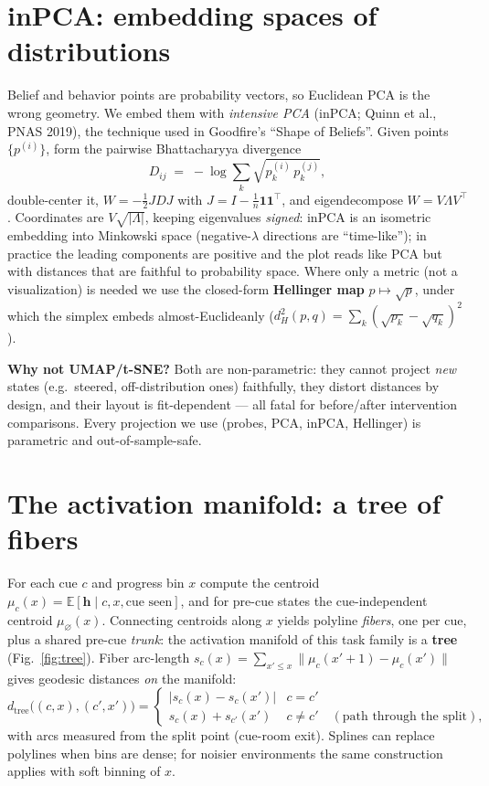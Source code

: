 \documentclass[11pt]{article}
\newcommand{\h}{\bm{h}}
\newcommand{\E}{\mathbb{E}}
\begin{document}
\section{inPCA: embedding spaces of distributions}
\label{sec:inpca}

Belief and behavior points are probability vectors, so Euclidean PCA is the
wrong geometry. We embed them with \emph{intensive PCA}
(inPCA; Quinn et al., PNAS 2019), the technique used in Goodfire's
``Shape of Beliefs''. Given points $\{p^{(i)}\}$, form the pairwise
Bhattacharyya divergence
\begin{equation}
  D_{ij} \;=\; -\log \textstyle\sum_k \sqrt{p^{(i)}_k\, p^{(j)}_k},
\end{equation}
double-center it, $W = -\tfrac12 J D J$ with $J = I - \tfrac1n \bm 1\bm 1^\top$,
and eigendecompose $W = V \Lambda V^\top$. Coordinates are
$V\sqrt{|\Lambda|}$, keeping eigenvalues \emph{signed}: inPCA is an isometric
embedding into Minkowski space (negative-$\lambda$ directions are
``time-like''); in practice the leading components are positive and the plot
reads like PCA but with distances that are faithful to probability space.
Where only a metric (not a visualization) is needed we use the closed-form
\textbf{Hellinger map} $p \mapsto \sqrt{p}$, under which the simplex embeds
almost-Euclideanly ($d_H^2(p,q) = \sum_k (\sqrt{p_k}-\sqrt{q_k})^2$).

\begin{tcolorbox}
\textbf{Why not UMAP/t-SNE?} Both are non-parametric: they cannot project
\emph{new} states (e.g.\ steered, off-distribution ones) faithfully, they
distort distances by design, and their layout is fit-dependent --- all fatal for
before/after intervention comparisons. Every projection we use (probes, PCA,
inPCA, Hellinger) is parametric and out-of-sample-safe.
\end{tcolorbox}

\section{The activation manifold: a tree of fibers}
\label{sec:tree}

For each cue $c$ and progress bin $x$ compute the centroid
$\mu_c(x) = \E[\h \mid c, x, \text{cue seen}]$, and for pre-cue states the
cue-independent centroid $\mu_\varnothing(x)$. Connecting centroids along $x$
yields polyline \emph{fibers}, one per cue, plus a shared pre-cue
\emph{trunk}: the activation manifold of this task family is a
\textbf{tree} (Fig.~\ref{fig:tree}). Fiber arc-length
$s_c(x) = \sum_{x' \le x} \lVert \mu_c(x'{+}1) - \mu_c(x') \rVert$ gives
geodesic distances \emph{on} the manifold:
\begin{equation}
  d_{\mathrm{tree}}\big((c,x),(c',x')\big) =
  \begin{cases}
    |s_c(x) - s_c(x')| & c = c'\\[2pt]
    s_c(x) + s_{c'}(x') & c \neq c' \quad (\text{path through the split}),
  \end{cases}
\end{equation}
with arcs measured from the split point (cue-room exit). Splines can replace
polylines when bins are dense; for noisier environments the same construction
applies with soft binning of $x$.
\end{document}
